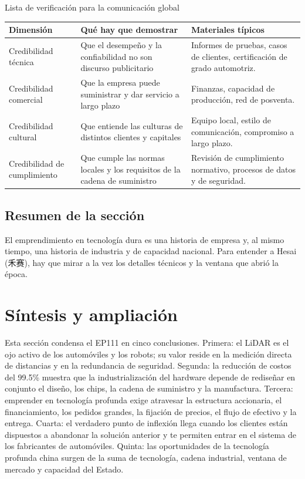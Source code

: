 \documentclass[a4paper]{article}
\begin{document}
\begin{knowledgebox}{Lista de verificación para la comunicación global}
\begin{tabularx}{\textwidth}{p{}p{}X}
\toprule
Dimensión & Qué hay que demostrar & Materiales típicos \\
\midrule
Credibilidad técnica & Que el desempeño y la confiabilidad no son discurso publicitario & Informes de pruebas, casos de clientes, certificación de grado automotriz. \\
Credibilidad comercial & Que la empresa puede suministrar y dar servicio a largo plazo & Finanzas, capacidad de producción, red de posventa. \\
Credibilidad cultural & Que entiende las culturas de distintos clientes y capitales & Equipo local, estilo de comunicación, compromiso a largo plazo. \\
Credibilidad de cumplimiento & Que cumple las normas locales y los requisitos de la cadena de suministro & Revisión de cumplimiento normativo, procesos de datos y de seguridad. \\
\bottomrule
\end{tabularx}
\end{knowledgebox}

\subsection{Resumen de la sección}

El emprendimiento en tecnología dura es una historia de empresa y, al mismo tiempo, una historia de industria y de capacidad nacional. Para entender a Hesai (禾赛), hay que mirar a la vez los detalles técnicos y la ventana que abrió la época.
\section{Síntesis y ampliación}

Esta sección condensa el EP111 en cinco conclusiones. Primera: el LiDAR es el ojo activo de los automóviles y los robots; su valor reside en la medición directa de distancias y en la redundancia de seguridad. Segunda: la reducción de costos del 99.5\% muestra que la industrialización del hardware depende de rediseñar en conjunto el diseño, los chips, la cadena de suministro y la manufactura. Tercera: emprender en tecnología profunda exige atravesar la estructura accionaria, el financiamiento, los pedidos grandes, la fijación de precios, el flujo de efectivo y la entrega. Cuarta: el verdadero punto de inflexión llega cuando los clientes están dispuestos a abandonar la solución anterior y te permiten entrar en el sistema de los fabricantes de automóviles. Quinta: las oportunidades de la tecnología profunda china surgen de la suma de tecnología, cadena industrial, ventana de mercado y capacidad del Estado.
\end{document}
